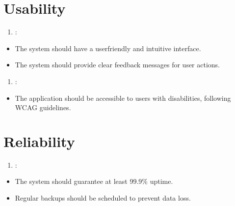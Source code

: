 \documentclass[letterpaper,10pt,english]{sphinxmanual}
\begin{document}
\section{Usability}
\label{\detokenize{modules/requirements:usability}}\begin{enumerate}
%
\setcounter{enumi}{4}
\item {} 
\sphinxAtStartPar
{}:

\end{enumerate}
\begin{itemize}
\item {} 
\sphinxAtStartPar
The system should have a user\sphinxhyphen{}friendly and intuitive interface.

\item {} 
\sphinxAtStartPar
The system should provide clear feedback messages for user actions.

\end{itemize}
\begin{enumerate}
%
\setcounter{enumi}{5}
\item {} 
\sphinxAtStartPar
{}:

\end{enumerate}
\begin{itemize}
\item {} 
\sphinxAtStartPar
The application should be accessible to users with disabilities, following WCAG guidelines.

\end{itemize}


\section{Reliability}
\label{\detokenize{modules/requirements:reliability}}\begin{enumerate}
%
\setcounter{enumi}{6}
\item {} 
\sphinxAtStartPar
{}:

\end{enumerate}
\begin{itemize}
\item {} 
\sphinxAtStartPar
The system should guarantee at least 99.9\% uptime.

\item {} 
\sphinxAtStartPar
Regular backups should be scheduled to prevent data loss.

\end{itemize}
\end{document}
